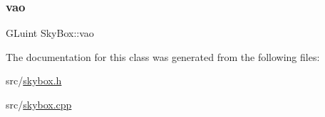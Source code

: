 \mbox{\label{classSkyBox_af762eed644f128a560e22d5003c5d447}} 
\subsubsection{\texorpdfstring{vao}{vao}}
{\footnotesize\ttfamily G\+Luint Sky\+Box\+::vao\hspace{0.3cm}{\ttfamily [protected]}}



The documentation for this class was generated from the following files\+:\begin{DoxyCompactItemize}
\item 
src/\hyperlink{skybox_8h}{skybox.\+h}\item 
src/\hyperlink{skybox_8cpp}{skybox.\+cpp}\end{DoxyCompactItemize}
